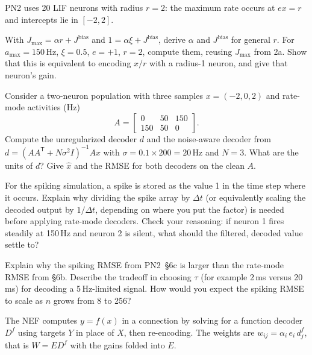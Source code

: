 \documentclass[10pt,letterpaper]{article}
\newcommand{\T}{\mathsf{T}}
\newcommand{\Jb}{J^{\mathrm{bias}}}
\newcommand{\qsec}[1]{\vspace{8pt}{\large\bfseries #1}\par\vspace{2pt}}
\begin{document}
\qsec{6. Population decoding of a time-varying signal}
PN2 uses 20 LIF neurons with radius $r = 2$: the maximum rate occurs at $e x = r$ and intercepts lie in $[-2, 2]$.

\begin{parts}
\item[6a.] With $J_{\max} = \alpha r + \Jb$ and $1 = \alpha\xi + \Jb$, derive $\alpha$ and $\Jb$ for general $r$. For $a_{\max} = 150$\,Hz, $\xi = 0.5$, $e = +1$, $r = 2$, compute them, reusing $J_{\max}$ from 2a. Show that this is equivalent to encoding $x/r$ with a radius-1 neuron, and give that neuron's gain.

\item[6b.] Consider a two-neuron population with three samples $x = (-2, 0, 2)$ and rate-mode activities (Hz)
\[
A = \begin{bmatrix} 0 & 50 & 150 \\ 150 & 50 & 0 \end{bmatrix}.
\]
Compute the unregularized decoder $d$ and the noise-aware decoder from $d = (AA^\T + N\sigma^2 I)^{-1}Ax$ with $\sigma = 0.1 \times 200 = 20$\,Hz and $N = 3$. What are the units of $d$? Give $\hat x$ and the RMSE for both decoders on the clean $A$.

\item[6c.] For the spiking simulation, a spike is stored as the value 1 in the time step where it occurs. Explain why dividing the spike array by $\Delta t$ (or equivalently scaling the decoded output by $1/\Delta t$, depending on where you put the factor) is needed before applying rate-mode decoders. Check your reasoning: if neuron 1 fires steadily at 150\,Hz and neuron 2 is silent, what should the filtered, decoded value settle to?

\item[6d.] Explain why the spiking RMSE from PN2~\S6c is larger than the rate-mode RMSE from \S6b. Describe the tradeoff in choosing $\tau$ (for example 2\,ms versus 20\,ms) for decoding a 5\,Hz-limited signal. How would you expect the spiking RMSE to scale as $n$ grows from 8 to 256?
\end{parts}

\qsec{7. Feedforward transformations}
The NEF computes $y = f(x)$ in a connection by solving for a function decoder $D^f$ using targets $Y$ in place of $X$, then re-encoding. The weights are $w_{ij} = \alpha_i\, e_i\, d^f_j$, that is $W = E D^f$ with the gains folded into $E$.
\end{document}
